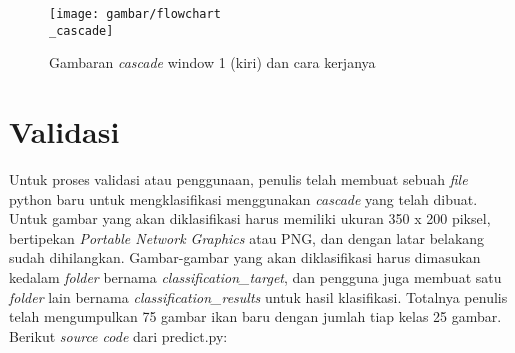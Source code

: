 		\begin{figure}[H]
			\centering{}
			  \texttt{[image: gambar/flowchart\\\_cascade]}
			\caption{Gambaran \textit{cascade} window 1 (kiri) dan cara kerjanya}
		\end{figure}

\section{Validasi}

		Untuk proses validasi atau penggunaan, penulis telah membuat sebuah \textit{file} 
		python baru untuk mengklasifikasi menggunakan \emph{cascade} yang telah dibuat. Untuk gambar 
		yang akan diklasifikasi harus memiliki ukuran 350 x 200 piksel, bertipekan \textit{Portable Network Graphics} 
		atau PNG, dan dengan latar belakang sudah dihilangkan. Gambar-gambar yang akan diklasifikasi harus 
		dimasukan kedalam \textit{folder} bernama \emph{classification\_target}, dan pengguna juga 
		membuat satu \textit{folder} lain bernama \emph{classification\_results} untuk hasil klasifikasi. 
		Totalnya penulis telah mengumpulkan 75 gambar ikan baru dengan jumlah tiap kelas 25 gambar.
		Berikut \textit{source code} dari predict.py:

